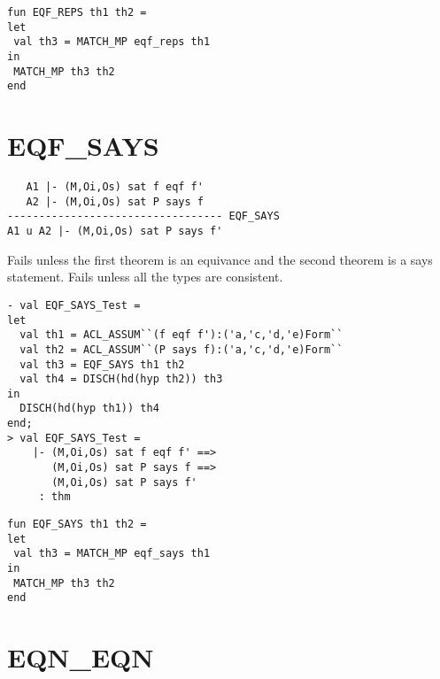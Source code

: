 \IMPLEMENTATION
\begin{holboxed}
\begin{verbatim}
fun EQF_REPS th1 th2 =
let
 val th3 = MATCH_MP eqf_reps th1
in
 MATCH_MP th3 th2
end
\end{verbatim}
\end{holboxed}


\ENDDOC


\section{EQF\_SAYS}



\egroup

\DESCRIBE
\begin{verbatim}
   A1 |- (M,Oi,Os) sat f eqf f'
   A2 |- (M,Oi,Os) sat P says f
---------------------------------- EQF_SAYS
A1 u A2 |- (M,Oi,Os) sat P says f'
\end{verbatim}

\FAILURE
Fails unless the first theorem is an equivance and the second theorem
is a says statement. Fails unless all the types are consistent.

\EXAMPLE
\begin{holboxed}
\begin{verbatim}
- val EQF_SAYS_Test =
let
  val th1 = ACL_ASSUM``(f eqf f'):('a,'c,'d,'e)Form``
  val th2 = ACL_ASSUM``(P says f):('a,'c,'d,'e)Form``
  val th3 = EQF_SAYS th1 th2
  val th4 = DISCH(hd(hyp th2)) th3
in
  DISCH(hd(hyp th1)) th4
end;
> val EQF_SAYS_Test =
    |- (M,Oi,Os) sat f eqf f' ==>
       (M,Oi,Os) sat P says f ==>
       (M,Oi,Os) sat P says f'
     : thm
\end{verbatim}
\end{holboxed}

\IMPLEMENTATION
\begin{holboxed}
\begin{verbatim}
fun EQF_SAYS th1 th2 =
let
 val th3 = MATCH_MP eqf_says th1
in
 MATCH_MP th3 th2
end
\end{verbatim}
\end{holboxed}


\ENDDOC


\section{EQN\_EQN}

